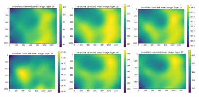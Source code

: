 \documentclass[letterpaper,11pt]{article}
\begin{document}
\begin{figure}[!ht]
\includegraphics[width=0.3\textwidth]{images/results/smoothed_corrected_mean_image_layers_vectra/smoothed_corrected_mean_image_layer_19}
\includegraphics[width=0.3\textwidth]{images/results/smoothed_corrected_mean_image_layers_vectra/smoothed_corrected_mean_image_layer_22}
\includegraphics[width=0.3\textwidth]{images/results/smoothed_corrected_mean_image_layers_vectra/smoothed_corrected_mean_image_layer_25}
\includegraphics[width=0.3\textwidth]{images/results/smoothed_corrected_mean_image_layers_vectra/smoothed_corrected_mean_image_layer_26}
\includegraphics[width=0.3\textwidth]{images/results/smoothed_corrected_mean_image_layers_vectra/smoothed_corrected_mean_image_layer_29}
\includegraphics[width=0.3\textwidth]{images/results/smoothed_corrected_mean_image_layers_vectra/smoothed_corrected_mean_image_layer_32}

\end{figure}
\end{document}
